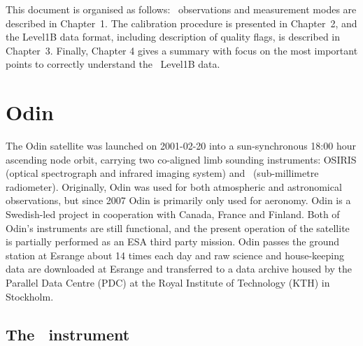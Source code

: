 This document is organised as follows:
\smr\ observations and measurement modes are described 
in Chapter~1. The calibration procedure is presented in
Chapter~2, and the Level1B data format, including description
of quality flags, is described in Chapter~3.
Finally,
Chapter 4 gives a summary with focus on the most important points to correctly
understand the \smr\ Level1B data. 
   

\section{Odin}

The Odin satellite was launched on 2001-02-20 into a sun-synchronous
18:00 hour ascending node orbit, carrying two co-aligned limb sounding
instruments: OSIRIS (optical spectrograph and infrared imaging system) and
\SMR\ (sub-millimetre radiometer). Originally, Odin was used for both
atmospheric and astronomical observations, but since 2007 Odin is primarily only
used for aeronomy. Odin is a Swedish-led project in cooperation with Canada,
France and Finland. Both of Odin's instruments are still functional, and the
present operation of the satellite is partially performed as an ESA third party
mission.
Odin passes the ground station at Esrange about 14 times each day
and raw science and house-keeping data are downloaded at
Esrange and transferred to a data archive housed by the Parallel
Data Centre (PDC) at the Royal Institute of Technology (KTH)
in Stockholm.


\subsection{The \SMR\ instrument}





